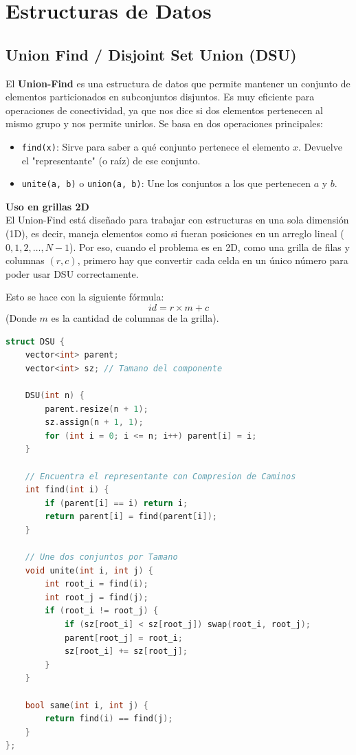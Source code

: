 \chapter{Estructuras de Datos}

\section{Union Find / Disjoint Set Union (DSU)}

El \textbf{Union-Find}  es una estructura de datos que permite mantener un conjunto de elementos particionados en subconjuntos disjuntos. Es muy eficiente para operaciones de conectividad, ya que nos dice si dos elementos pertenecen al mismo grupo y nos permite unirlos. Se basa en dos operaciones principales:
\begin{itemize}
    \item \texttt{find(x)}: Sirve para saber a qué conjunto pertenece el elemento $x$. Devuelve el "representante" (o raíz) de ese conjunto.
    \item \texttt{unite(a, b)} o \texttt{union(a, b)}: Une los conjuntos a los que pertenecen $a$ y $b$.
\end{itemize}

\textbf{Uso en grillas 2D} \\
El Union-Find está diseñado para trabajar con estructuras en una sola dimensión (1D), es decir, maneja elementos como si fueran posiciones en un arreglo lineal ($0, 1, 2, \dots, N-1$). Por eso, cuando el problema es en 2D, como una grilla de filas y columnas $(r, c)$, primero hay que convertir cada celda en un único número para poder usar DSU correctamente. 

Esto se hace con la siguiente fórmula:
\[ id = r \times m + c \]
(Donde $m$ es la cantidad de columnas de la grilla). 

\begin{lstlisting}[language=C++]
struct DSU {
    vector<int> parent;
    vector<int> sz; // Tamano del componente

    DSU(int n) {
        parent.resize(n + 1);
        sz.assign(n + 1, 1);
        for (int i = 0; i <= n; i++) parent[i] = i;
    }

    // Encuentra el representante con Compresion de Caminos
    int find(int i) {
        if (parent[i] == i) return i;
        return parent[i] = find(parent[i]);
    }

    // Une dos conjuntos por Tamano
    void unite(int i, int j) {
        int root_i = find(i);
        int root_j = find(j);
        if (root_i != root_j) {
            if (sz[root_i] < sz[root_j]) swap(root_i, root_j);
            parent[root_j] = root_i;
            sz[root_i] += sz[root_j];
        }
    }

    bool same(int i, int j) {
        return find(i) == find(j);
    }
};
\end{lstlisting}

